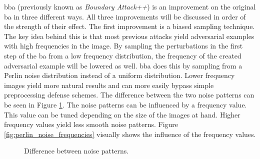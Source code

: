 \gls{bba} \cite{brunner_guessing_2019} (previously known as \textit{Boundary Attack++}) is an improvement on the original \gls{ba} in three different ways. All three improvements will be discussed in order of the strength of their effect. The first improvement is a biased sampling technique. The key idea behind this is that most previous attacks yield adversarial examples with high frequencies in the image. By sampling the perturbations in the first step of the \gls{ba} from a low frequency distribution, the frequency of the created adversarial example will be lowered as well. \gls{bba} does this by sampling from a Perlin noise \cite{perlin} distribution instead of a uniform distribution. Lower frequency images yield more natural results and can more easily bypass simple preprocessing defense schemes. The difference between the two noise patterns can be seen in Figure \ref{fig:noise_differences}. The noise patterns can be influenced by a frequency value. This value can be tuned depending on the size of the images at hand. Higher frequency values yield less smooth noise patterns. Figure \ref{fig:perlin_noise_frequencies} visually shows the influence of the frequency values.\\

\begin{figure}
	\centering
	\qquad
	\caption[Difference between noise patterns]{Difference between noise patterns.}
	\label{fig:noise_differences}
\end{figure}

